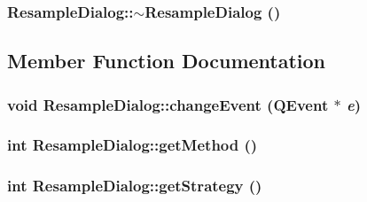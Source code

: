 \hypertarget{class_resample_dialog_4204be68cd651114d94661717030b0bc}{
\subsubsection[{$\sim$ResampleDialog}]{\setlength{\rightskip}{0pt plus 5cm}ResampleDialog::$\sim$ResampleDialog ()}}
\label{class_resample_dialog_4204be68cd651114d94661717030b0bc}




\subsection{Member Function Documentation}
\hypertarget{class_resample_dialog_823a4e6d2b903ccb12c0ec31d4728344}{
\subsubsection[{changeEvent}]{\setlength{\rightskip}{0pt plus 5cm}void ResampleDialog::changeEvent (QEvent $\ast$ {\em e})}}
\label{class_resample_dialog_823a4e6d2b903ccb12c0ec31d4728344}


\hypertarget{class_resample_dialog_e7747ae10c66293869739f44ea4a0f2c}{
\subsubsection[{getMethod}]{\setlength{\rightskip}{0pt plus 5cm}int ResampleDialog::getMethod ()}}
\label{class_resample_dialog_e7747ae10c66293869739f44ea4a0f2c}


\hypertarget{class_resample_dialog_044ce1050b00f3dd2eaf16fd4d45cc1d}{
\subsubsection[{getStrategy}]{\setlength{\rightskip}{0pt plus 5cm}int ResampleDialog::getStrategy ()}}
\label{class_resample_dialog_044ce1050b00f3dd2eaf16fd4d45cc1d}


